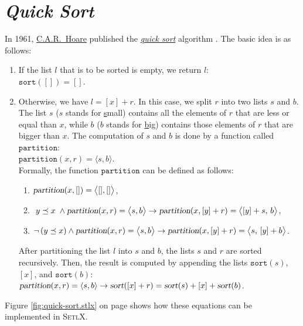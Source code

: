 \section{\emph{Quick Sort}}
In 1961, \href{http://en.wikipedia.org/wiki/Tony_Hoare}{C.A.R.~Hoare} published the
\href{http://en.wikipedia.org/wiki/Quicksort}{\emph{quick sort}}  
algorithm \cite{hoare:61}.  The basic idea is as follows:
\begin{enumerate}
\item If the list $l$ that is to be sorted is empty, we return $l$: 
      \\[0.2cm]
      \hspace*{1.3cm} $\mathtt{sort}([]) = []$.
\item Otherwise, we have $l = [x] + r$.  In this case, we split $r$ into two lists $s$ and $b$.
      The list $s$ ($s$ stands for \underline{s}mall) contains all the elements of $r$ that are less
      or equal than $x$,     while $b$ ($b$ stands for \underline{b}ig) contains
      those elements of $r$ that are bigger than $x$.  The computation of $s$ and $b$ is done by a
      function called $\mathtt{partition}$: 
      \\[0.2cm]
      \hspace*{1.3cm}
      $\texttt{partition}(x,r) = \langle s,b \rangle$.
      \\[0.2cm]
      Formally, the function $\texttt{partition}$ can be defined as follows:
      \begin{enumerate}
      \item $\textsl{partition}(x, []) = \bigl\langle[], []\bigr\rangle$,
      \item \quad 
            $\; y \preceq x\; \wedge \textsl{partition}(x,r) = \bigl\langle s, b \bigr\rangle \rightarrow 
             \textsl{partition}(x, [y] + r) = \bigl\langle [y] + s,\, b \bigr\rangle$,
      \item $\neg\, (y \preceq x) \wedge \textsl{partition}(x,r) = \bigl\langle s, b \bigr\rangle \rightarrow 
             \textsl{partition}(x, [y] + r) = \bigl\langle s,\, [y] + b \bigr\rangle$.
      \end{enumerate}
      After partitioning the list $l$ into $s$ and $b$, the lists $s$ and $r$ are sorted
      recursively.  Then, the result is computed by appending the lists $\mathtt{sort}(s)$,
      $[x]$, and $\mathtt{sort}(b)$:
      \\[0.2cm]
      \hspace*{1.3cm}
      $\textsl{partition}(x,r) = \langle s,b \rangle \rightarrow 
       \textsl{sort}([x] + r) = \textsl{sort}(s) + [x] + \textsl{sort}(b)$.
\end{enumerate}
Figure \ref{fig:quick-sort.stlx} on page \pageref{fig:quick-sort.stlx} shows how these equations can
be implemented in \textsc{SetlX}.


